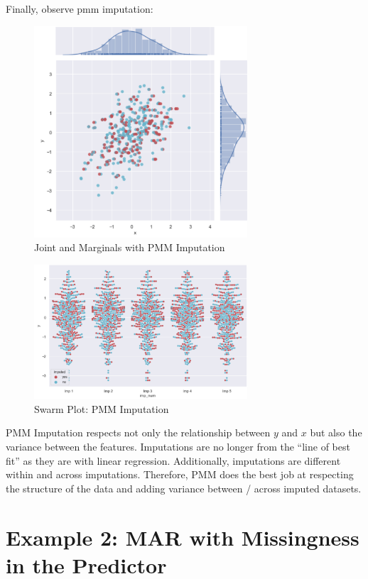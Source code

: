 \documentclass[12pt,oneside]{chicagocapstone}
\begin{document}
Finally, observe pmm imputation:
\begin{figure}

{\centering \includegraphics[width=300px]{figure/multi-pmm} 

}

\caption{Joint and Marginals with PMM Imputation}\label{fig:multi-pmm}
\end{figure}
\begin{figure}

{\centering \includegraphics[width=300px]{figure/swarm-pmm} 

}

\caption{Swarm Plot: PMM Imputation}\label{fig:swarm-pmm}
\end{figure}
PMM Imputation respects not only the relationship between \(y\) and
\(x\) but also the variance between the features. Imputations are no
longer from the ``line of best fit'' as they are with linear regression.
Additionally, imputations are different within and across imputations.
Therefore, PMM does the best job at respecting the structure of the data
and adding variance between / across imputed datasets.

\section*{Example 2: MAR with Missingness in the
Predictor}\label{example-2-mar-with-missingness-in-the-predictor}
\end{document}

